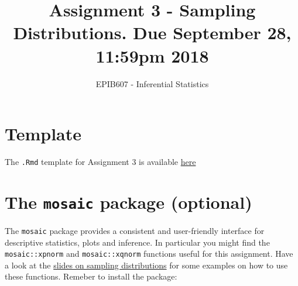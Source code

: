 \documentclass[letterpaper,9pt,twoside,printwatermark=false]{pinp}
\title{Assignment 3 - Sampling Distributions. Due September 28, 11:59pm 2018}
\author[a]{EPIB607 - Inferential Statistics}
\affil[a]{Fall 2018, McGill University}
\begin{document}
\verticaladjustment{-2pt}

\maketitle
\thispagestyle{firststyle}



\section*{Template}\label{template}

The \texttt{.Rmd} template for Assignment 3 is available
\href{https://github.com/sahirbhatnagar/EPIB607/raw/master/assignments/a3/a3_template.Rmd}{here}

\section*{\texorpdfstring{The \texttt{mosaic} package
(optional)}{The mosaic package (optional)}}\label{the-mosaic-package-optional}

The \texttt{mosaic} package provides a consistent and user-friendly
interface for descriptive statistics, plots and inference. In particular
you might find the \texttt{mosaic::xpnorm} and \texttt{mosaic::xqnorm}
functions useful for this assignment. Have a look at the
\href{https://github.com/sahirbhatnagar/EPIB607/raw/master/slides/sampling_dist/EPIB607_sampling_dist.pdf}{slides
on sampling distributions} for some examples on how to use these
functions. Remeber to install the package:

\begin{Shaded}
\begin{Highlighting}[]
\NormalTok{(}\NormalTok{, } \NormalTok{)}
\end{Highlighting}
\end{Shaded}
\end{document}
